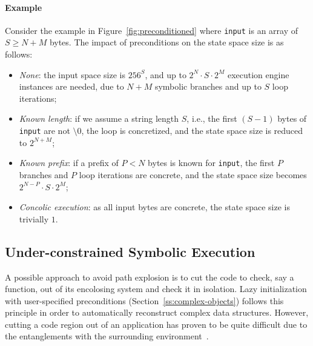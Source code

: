 \paragraph{Example} Consider the example in Figure~\ref{fig:preconditioned} where {\tt input} is an array of $S\ge N+M$ bytes. The impact of preconditions on the state space size is as follows:


\begin{itemize}
  \item {\em None}: the input space size is $256^S$, and up to $2^N\cdot S\cdot 2^M$ execution engine instances are needed, due to $N+M$ symbolic branches and up to $S$ loop iterations;
  \item {\em Known length}: if we assume a string length $S$, i.e., the first $(S-1)$ bytes of {\tt input} are not $\setminus0$, the loop is concretized, and the state space size is reduced to $2^{N+M}$;
  \item {\em Known prefix}: if a prefix of $P<N$ bytes is known for {\tt input}, the first $P$ branches and $P$ loop iterations are concrete, and the state space size becomes $2^{N-P}\cdot S\cdot 2^M$;
  \item {\em Concolic execution}: as all input bytes are concrete, the state space size is trivially $1$.
\end{itemize}





\subsection{Under-constrained Symbolic Execution} 
\label{under-constrained}

A possible approach to avoid path explosion is to cut the code to check, say a function, out of its encolosing system and check it in isolation. Lazy initialization with user-specified preconditions (Section~\ref{ss:complex-objects}) follows this principle in order to automatically reconstruct complex  data structures. However, cutting a code region out of an application has proven to be quite difficult due to the entanglements with the surrounding environment~\cite{ED-ISSTA07}.

